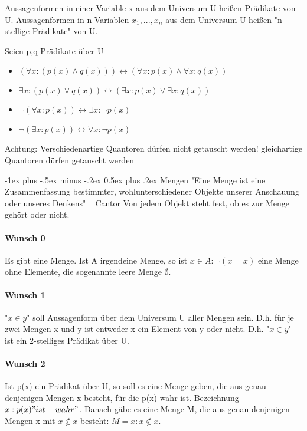 \documentclass[10pt,landscape]{article}
\makeatletter
\renewcommand{\section}{\@startsection{section}{1}{0mm}%
                                {-1ex plus -.5ex minus -.2ex}%
                                {0.5ex plus .2ex}%
                                {\normalfont\large\bfseries}}
\makeatother
\begin{document}
\begin{multicols}{3}
Aussagenformen in einer Variable x aus dem Universum U heißen Prädikate von U. Aussagenformen in n Variablen $x_1,...,x_n$ aus dem Universum U heißen "n-stellige Prädikate" von U.

Seien p,q Prädikate über U
\begin{itemize}
    \item $(\forall x: (p(x) \wedge q(x)))\leftrightarrow (\forall x: p(x) \wedge \forall x: q(x))$
    \item $\exists x: (p(x) \vee q(x)) \leftrightarrow (\exists x: p(x) \vee \exists x: q(x))$
    \item $\neg (\forall x:p(x))\leftrightarrow \exists x: \neg p(x)$
    \item $\neg(\exists x:p(x))\leftrightarrow \forall x:\neg p(x)$
\end{itemize}
Achtung: Verschiedenartige Quantoren dürfen nicht getauscht werden! gleichartige Quantoren dürfen getauscht werden

\section{Mengen}
"Eine Menge ist eine Zusammenfassung bestimmter, wohlunterschiedener Objekte unserer Anschauung oder unseres Denkens" ~ Cantor
Von jedem Objekt steht fest, ob es zur Menge gehört oder nicht.

\paragraph{Wunsch 0}
Es gibt eine Menge. Ist A irgendeine Menge, so ist ${x \in A: \neg (x=x)}$ eine Menge ohne Elemente, die sogenannte leere Menge $\emptyset$.

\paragraph{Wunsch 1}
"$x\in y$" soll Aussagenform über dem Universum U aller Mengen sein. D.h. für je zwei Mengen x und y ist entweder x ein Element von y oder nicht. D.h. "$x\in y$" ist ein 2-stelliges Prädikat über U.

\paragraph{Wunsch 2}
Ist p(x) ein Prädikat über U, so soll es eine Menge geben, die aus genau denjenigen Mengen x besteht, für die p(x) wahr ist. Bezeichnung ${x:p(x) "ist-wahr" }$.
Danach gäbe es eine Menge M, die aus genau denjenigen Mengen x mit $x\not \in x$ besteht: $M={x:x\not \in x}$.


\end{multicols}
\end{document}
